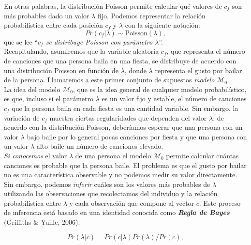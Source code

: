 \documentclass{article}
\begin{document}
\indent En otras palabras, la distribución Poisson permite calcular qué valores de $c_f$ son más probables dado un valor $\lambda$ fijo.  Podemos representar la relación probabilística entre cada posición $c_f$ y $\lambda$ con la siguiente notación:
\begin{equation}
Pr(c_f|\lambda)\sim \mathrm{Poisson}(\lambda)\label{M0_1},
\end{equation}
\noindent que se lee ``\emph{$c_f$ se distribuye Poisson con parámetro $\lambda$}''.\\
\indent Recapitulando, asumiremos que la variable aleatoria $c_f$, que representa el número de canciones que una persona baila en una fiesta, se distribuye de acuerdo con una distribución Poisson en función de $\lambda$, donde $\lambda$ representa el gusto por bailar de la persona. Llamaremos a este primer conjunto de supuestos \emph{modelo} $\mathcal M_0$.\\
\indent La idea del modelo $\mathcal M_0$, que es la idea general de cualquier modelo probabilístico, es que, incluso si el parámetro $\lambda$ es un valor fijo y estable, el número de canciones $c_f$ que la persona baila en cada fiesta es una cantidad variable. Sin embargo, la variación de $c_f$ muestra ciertas regularidades que dependen del valor $\lambda$: de acuerdo con la distribución Poisson, deberíamos esperar que una persona con un valor $\lambda$ bajo baile por lo general pocas canciones por fiesta y que una persona con un valor $\lambda$ alto baile un número de canciones elevado.\\ 
\indent\emph{Si conocemos} el valor $\lambda$ de una persona el modelo $\mathcal M_0$ permite calcular cuántas canciones es probable que la persona baile. El problema es que el gusto por bailar no es una característica observable y no podemos medir su valor directamente.   Sin embargo, podemos \emph{inferir} cuáles son los valores más probables de $\lambda$ utilizando las observaciones que recolectamos del individuo y la relación probabilística entre $\lambda$ y cada observación que compone al vector $c$. Este proceso de inferencia está basado en una identidad conocida como  \emph{\textbf{Regla de Bayes}} (Griffiths \& Yuille, 2006):
 
\begin{equation}
Pr(\lambda|c)=Pr(c|\lambda)Pr(\lambda)/Pr(c),
\end{equation}
\end{document}
